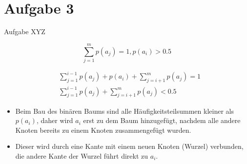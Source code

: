 
\section{Aufgabe 3}

\setcounter{exercise}{1}

\begin{frame}[allowframebreaks]{Aufgabe \thesection}{XYZ}
  \begin{requirementsnoinc}
    \[
      \sum_{j=1}^{m}p(a_{j})=1,p(a_{i})> 0.5
    \]
  \end{requirementsnoinc}
  \begin{solutionnoinc}
    \begin{align*}
      &\sum_{j=1}^{i-1}p(a_{j})+p(a_{i})+\sum_{j=i+1}^{m}p(a_{j})=1\\
      &\sum_{j=1}^{i-1}p(a_{j})+\sum_{j=i+1}^{m}p(a_{j})< 0.5
    \end{align*}
  \end{solutionnoinc}
  \begin{solutionnoinc}
    \begin{itemize}
      \item Beim Bau des binären Baums sind alle Häufigkeitsteilsummen kleiner als $p(a_i)$, daher wird $a_i$ erst zu dem Baum hinzugefügt, nachdem alle andere Knoten bereits zu einem Knoten zusammengefügt wurden. 
      \item Dieser wird durch eine Kante mit einem neuen Knoten (Wurzel) verbunden, die andere Kante der Wurzel führt direkt zu $a_i$.
    \end{itemize}
    \vspace{0.5cm}
  \end{solutionnoinc}
\end{frame}


